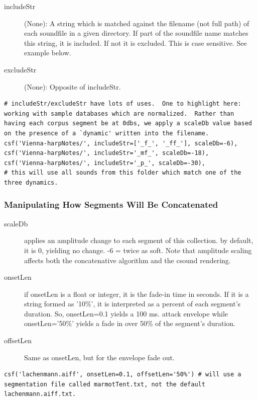 \documentclass{article}
\begin{document}
\begin{spacing}{1.2}
\begin{description}
\item[includeStr] (None): A string which is matched against the filename (not full path) of each soundfile in a given directory.  If part of the soundfile name matches this string, it is included.  If not it is excluded.  This is case sensitive.  See example below.

\item[excludeStr] (None): Opposite of includeStr.
\end{description}

\begin{lstlisting}
# includeStr/excludeStr have lots of uses.  One to highlight here: working with sample databases which are normalized.  Rather than having each corpus segment be at 0dbs, we apply a scaleDb value based on the presence of a `dynamic' written into the filename.
csf('Vienna-harpNotes/', includeStr=['_f_', '_ff_'], scaleDb=-6),
csf('Vienna-harpNotes/', includeStr='_mf_', scaleDb=-18),
csf('Vienna-harpNotes/', includeStr='_p_', scaleDb=-30),
# this will use all sounds from this folder which match one of the three dynamics.
\end{lstlisting}





\subsubsection{Manipulating How Segments Will Be Concatenated}
\begin{description}
\item[scaleDb] applies an amplitude change to each segment of this collection. by default, it is 0, yielding no change. -6 = twice as soft.  Note that amplitude scaling affects both the concatenative algorithm and the csound rendering.  

\item[onsetLen] if onsetLen is a float or integer, it is the fade-in time in seconds.  If it is a string formed as '10\%', it is interpreted as a percent of each segment's duration.  So, onsetLen=0.1 yields a 100 ms. attack envelope while onsetLen='50\%' yields a fade in over 50\% of the segment's duration.

\item[offsetLen] Same as onsetLen, but for the envelope fade out.

\end{description}
\begin{lstlisting}
csf('lachenmann.aiff', onsetLen=0.1, offsetLen='50%') # will use a segmentation file called marmotTent.txt, not the default lachenmann.aiff.txt.
\end{lstlisting}
\begin{description}


\end{description}
\end{spacing}
\end{document}
